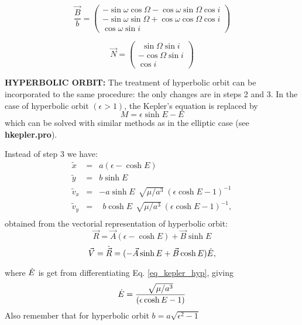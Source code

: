 \documentclass[a4paper,12pt]{article}
\def\p{\mathaccent 95 }
\def\sini {\sin i}
\def\cosi {\cos i}
\def\sino {\sin \Omega}
\def\coso {\cos \Omega}
\def\sinw {\sin \omega}
\def\cosw {\cos \omega}
\begin{document}
{{\begin{equation}
\frac{\vec B}{b} = \begin{pmatrix} -\sinw \coso - \cosw \sino \cosi \\ -\sinw \sino + \cosw \coso \cosi \\ \cosw \sini \end{pmatrix}
\end{equation}

\begin{equation}
\vec N = \begin{pmatrix} ~~\sino \sini \\ -\coso \sini \\ \cosi \end{pmatrix}
\label{eq_n}
\end{equation}

\vskip 1cm
{\bf HYPERBOLIC ORBIT:}
The treatment of hyperbolic orbit can be incorporated to the same
procedure: the only changes are in steps 2 and 3. In the case of hyperbolic
orbit $(\epsilon > 1)$, the Kepler's equation is replaced by
\begin{equation}
 M = \epsilon \sinh E  - E
\label{eq_kepler_hyp} 
\end{equation}
\noindent which can be solved with similar methods as in the elliptic case
(see {\bf hkepler.pro}). 

\newpage
\noindent Instead of step 3 we have:
\begin{eqnarray}
{\tilde x} &=& a (\epsilon - \cosh E) \\ \nonumber
{\tilde y} &=& b  \sinh E             \\ \nonumber 
{\tilde v_x} &=& -a \sinh E ~~ \sqrt{\mu/a^3} \ (\epsilon \cosh E -1)^{-1}    \\ \nonumber
{\tilde v_y} &=&  ~~ b \cosh E  ~~ \sqrt{\mu/a^3} \  (\epsilon \cosh E -1)^{-1},      \\ \nonumber
\end{eqnarray}
\noindent obtained from the vectorial representation of hyperbolic orbit:
\begin{equation}
\vec R = \vec A (\epsilon - \cosh E) + \vec B \sinh E
\label{eq_vec_r_hyp}
\end{equation}
\begin{equation}
\vec V =\p {\vec R} = (- \vec A \sinh E + \vec B \cosh E) \p E,
\label{eq_vec_v_hyp}
\end{equation}

\noindent where $\p E$ is get from differentiating Eq. 
\ref{eq_kepler_hyp}, giving
\begin{equation}
\p E = \frac{\sqrt{\mu/a^3}}{(\epsilon \cosh E -1)}
\label{eq_ep_hyp}
\end{equation}
\noindent Also remember that for hyperbolic orbit $b=a \sqrt{\epsilon^2-1}$

}}
\end{document}
